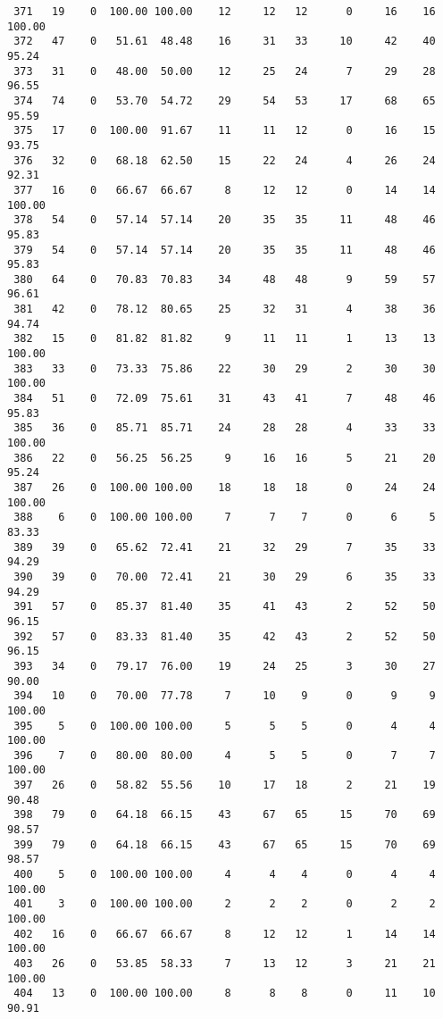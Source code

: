 \begin{verbatim}
 371   19    0  100.00 100.00    12     12   12      0     16    16   100.00
 372   47    0   51.61  48.48    16     31   33     10     42    40    95.24
 373   31    0   48.00  50.00    12     25   24      7     29    28    96.55
 374   74    0   53.70  54.72    29     54   53     17     68    65    95.59
 375   17    0  100.00  91.67    11     11   12      0     16    15    93.75
 376   32    0   68.18  62.50    15     22   24      4     26    24    92.31
 377   16    0   66.67  66.67     8     12   12      0     14    14   100.00
 378   54    0   57.14  57.14    20     35   35     11     48    46    95.83
 379   54    0   57.14  57.14    20     35   35     11     48    46    95.83
 380   64    0   70.83  70.83    34     48   48      9     59    57    96.61
 381   42    0   78.12  80.65    25     32   31      4     38    36    94.74
 382   15    0   81.82  81.82     9     11   11      1     13    13   100.00
 383   33    0   73.33  75.86    22     30   29      2     30    30   100.00
 384   51    0   72.09  75.61    31     43   41      7     48    46    95.83
 385   36    0   85.71  85.71    24     28   28      4     33    33   100.00
 386   22    0   56.25  56.25     9     16   16      5     21    20    95.24
 387   26    0  100.00 100.00    18     18   18      0     24    24   100.00
 388    6    0  100.00 100.00     7      7    7      0      6     5    83.33
 389   39    0   65.62  72.41    21     32   29      7     35    33    94.29
 390   39    0   70.00  72.41    21     30   29      6     35    33    94.29
 391   57    0   85.37  81.40    35     41   43      2     52    50    96.15
 392   57    0   83.33  81.40    35     42   43      2     52    50    96.15
 393   34    0   79.17  76.00    19     24   25      3     30    27    90.00
 394   10    0   70.00  77.78     7     10    9      0      9     9   100.00
 395    5    0  100.00 100.00     5      5    5      0      4     4   100.00
 396    7    0   80.00  80.00     4      5    5      0      7     7   100.00
 397   26    0   58.82  55.56    10     17   18      2     21    19    90.48
 398   79    0   64.18  66.15    43     67   65     15     70    69    98.57
 399   79    0   64.18  66.15    43     67   65     15     70    69    98.57
 400    5    0  100.00 100.00     4      4    4      0      4     4   100.00
 401    3    0  100.00 100.00     2      2    2      0      2     2   100.00
 402   16    0   66.67  66.67     8     12   12      1     14    14   100.00
 403   26    0   53.85  58.33     7     13   12      3     21    21   100.00
 404   13    0  100.00 100.00     8      8    8      0     11    10    90.91

\end{verbatim}
